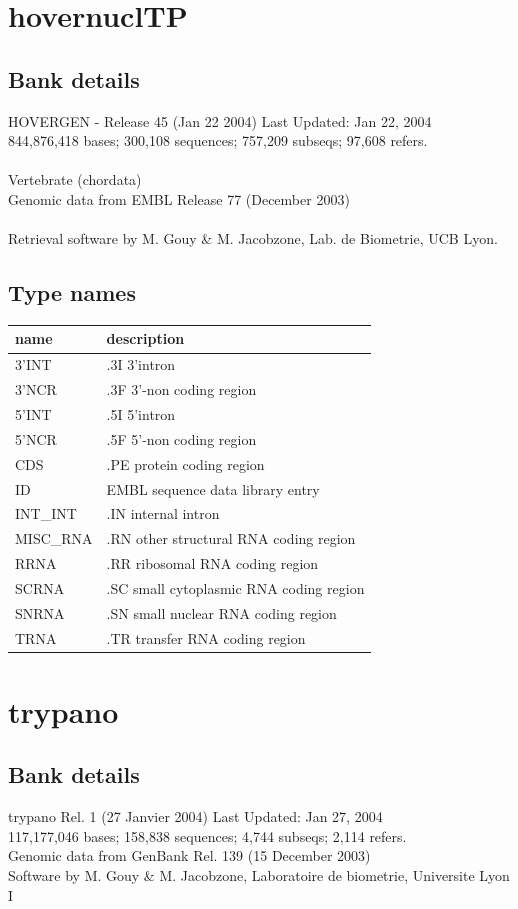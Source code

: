 \documentclass{article}
\begin{document}
\begin{Schunk}
\section{ hovernuclTP }
\subsection{Bank details}
HOVERGEN - Release 45 (Jan 22 2004) Last Updated: Jan 22, 2004\\
844,876,418 bases; 300,108 sequences; 757,209 subseqs; 97,608 refers.\\
\\
Vertebrate (chordata)\\
Genomic data from EMBL Release 77  (December 2003)\\
\\
Retrieval software by M. Gouy \& M. Jacobzone, Lab. de Biometrie, UCB Lyon.

\subsection{Type names}
\noindent\begin{tabular}{ll}
\hline \hline
name & description\\
\hline
3'INT & .3I 3'intron \\
3'NCR & .3F  3'-non coding region \\
5'INT & .5I 5'intron \\
5'NCR & .5F  5'-non coding region \\
CDS & .PE protein coding region \\
ID & EMBL sequence data library entry \\
INT\_INT & .IN  internal intron \\
MISC\_RNA & .RN other structural RNA coding region \\
RRNA & .RR ribosomal RNA coding region \\
SCRNA & .SC small cytoplasmic RNA coding region \\
SNRNA & .SN small nuclear RNA coding region \\
TRNA & .TR transfer RNA coding region \\
\hline \hline
\end{tabular}

\section{ trypano }
\subsection{Bank details}
trypano Rel. 1 (27 Janvier 2004) Last Updated: Jan 27, 2004\\
117,177,046 bases; 158,838 sequences; 4,744 subseqs; 2,114 refers.\\
Genomic data from GenBank Rel. 139 (15 December 2003)\\
Software by M. Gouy \& M. Jacobzone, Laboratoire de biometrie, Universite Lyon I


\end{Schunk}
\end{document}
